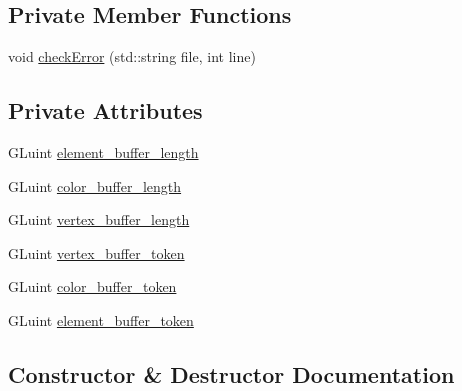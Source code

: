\subsection*{Private Member Functions}
\begin{DoxyCompactItemize}
\item 
void \hyperlink{classPyramidAsset_a34350044042e0098446dc9e0a260cb70}{check\+Error} (std\+::string file, int line)
\end{DoxyCompactItemize}
\subsection*{Private Attributes}
\begin{DoxyCompactItemize}
\item 
G\+Luint \hyperlink{classPyramidAsset_a5566105859271b493eab3b5f9c02f866}{element\+\_\+buffer\+\_\+length}
\item 
G\+Luint \hyperlink{classPyramidAsset_ae576f67cdec51a52645131919d86a38a}{color\+\_\+buffer\+\_\+length}
\item 
G\+Luint \hyperlink{classPyramidAsset_a9252f29d7dc33374d43dd779db4fcce4}{vertex\+\_\+buffer\+\_\+length}
\item 
G\+Luint \hyperlink{classPyramidAsset_a54d9cec42bc77d07a66e6c1cd55049b0}{vertex\+\_\+buffer\+\_\+token}
\item 
G\+Luint \hyperlink{classPyramidAsset_a7a984ee57fa7deda5aedf8b1f5f85c6f}{color\+\_\+buffer\+\_\+token}
\item 
G\+Luint \hyperlink{classPyramidAsset_a6f7e2f50904d2941e33df8eb7f5f9c2d}{element\+\_\+buffer\+\_\+token}
\end{DoxyCompactItemize}


\subsection{Constructor \& Destructor Documentation}
\hypertarget{classPyramidAsset_a3f7c6fd658ed0d3e276d7fe6c1de95d1}{}
